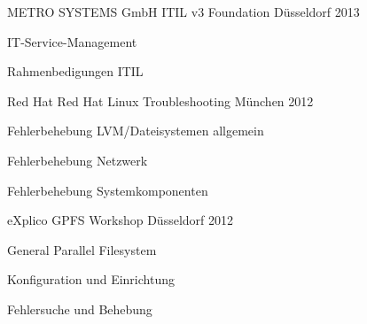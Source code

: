 \begin{cventries}
  \cventry
    {METRO SYSTEMS GmbH} %
    {ITIL v3 Foundation} %
    {Düsseldorf} %
    {2013} %
    {
      \begin{cvitems} %
        \item {IT-Service-Management}
        \item {Rahmenbedigungen ITIL}
      \end{cvitems}
    }

  \cventry
    {Red Hat} %
    {Red Hat Linux Troubleshooting} %
    {München} %
    {2012} %
    {
      \begin{cvitems} %
        \item {Fehlerbehebung LVM/Dateisystemen allgemein}
        \item {Fehlerbehebung Netzwerk}
        \item {Fehlerbehebung Systemkomponenten}
      \end{cvitems}
    }

  \cventry
    {eXplico} %
    {GPFS Workshop} %
    {Düsseldorf} %
    {2012} %
    {
      \begin{cvitems} %
        \item {General Parallel Filesystem}
        \item {Konfiguration und Einrichtung}
        \item {Fehlersuche und Behebung}
      \end{cvitems}
    }

\end{cventries}
